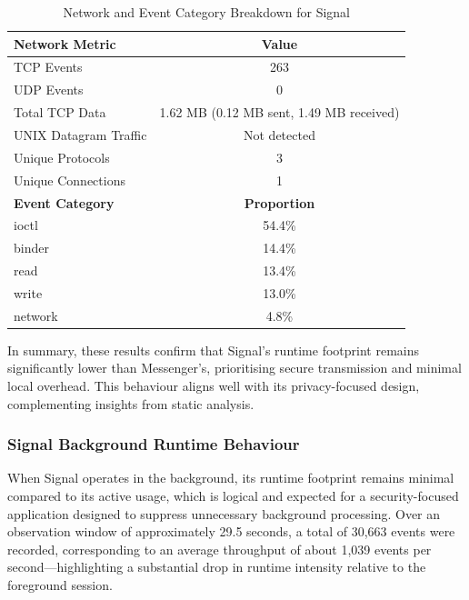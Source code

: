 \documentclass[a4paper,12pt]{report}
\begin{document}
\begin{table}[H]
    \centering
    \caption{Network and Event Category Breakdown for Signal}
    \label{tab:signal_network_category}
    \begin{tabular}{|l|c|}
        \hline
        \textbf{Network Metric} & \textbf{Value} \\
        \hline
        TCP Events & 263 \\
        UDP Events & 0 \\
        Total TCP Data & 1.62 MB (0.12 MB sent, 1.49 MB received) \\
        UNIX Datagram Traffic & Not detected \\
        Unique Protocols & 3 \\
        Unique Connections & 1 \\
        \hline
        \textbf{Event Category} & \textbf{Proportion} \\
        \hline
        ioctl & 54.4\% \\
        binder & 14.4\% \\
        read & 13.4\% \\
        write & 13.0\% \\
        network & 4.8\% \\
        \hline
    \end{tabular}
\end{table}

In summary, these results confirm that Signal’s runtime footprint remains significantly lower than Messenger’s, prioritising secure transmission and minimal local overhead. This behaviour aligns well with its privacy-focused design, complementing insights from static analysis.



\subsubsection{Signal Background Runtime Behaviour}

When Signal operates in the background, its runtime footprint remains minimal compared to its active usage, which is logical and expected for a security-focused application designed to suppress unnecessary background processing. Over an observation window of approximately 29.5 seconds, a total of 30,663 events were recorded, corresponding to an average throughput of about 1,039 events per second—highlighting a substantial drop in runtime intensity relative to the foreground session.
\end{document}

